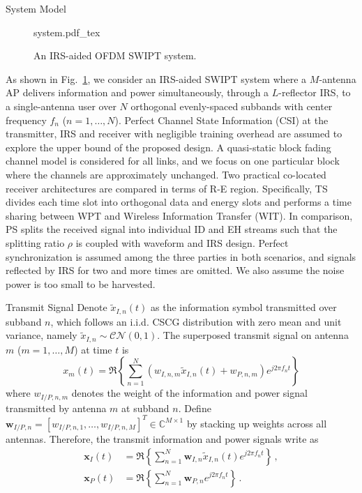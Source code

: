 \documentclass[journal]{IEEEtran}
\begin{document}
	\begin{section}{System Model}\label{se:system_model}
		\begin{figure}[!t]
			\centering
			\def\svgwidth{\columnwidth}
			{system.pdf_tex}
			\caption{An IRS-aided OFDM SWIPT system.}
			\label{fi:system}
		\end{figure}

		As shown in Fig.~\ref{fi:system}, we consider an IRS-aided SWIPT system where a $M$-antenna AP delivers information and power simultaneously, through a $L$-reflector IRS, to a single-antenna user over $N$ orthogonal evenly-spaced subbands with center frequency $f_n$ ($n=1,\dots,N$). Perfect Channel State Information (CSI) at the transmitter, IRS and receiver with negligible training overhead are assumed to explore the upper bound of the proposed design. A quasi-static block fading channel model is considered for all links, and we focus on one particular block where the channels are approximately unchanged. Two practical co-located receiver architectures are compared in terms of R-E region. Specifically, TS divides each time slot into orthogonal data and energy slots and performs a time sharing between WPT and Wireless Information Transfer (WIT). In comparison, PS splits the received signal into individual ID and EH streams such that the splitting ratio $\rho$ is coupled with waveform and IRS design. Perfect synchronization is assumed among the three parties in both scenarios, and signals reflected by IRS for two and more times are omitted. We also assume the noise power is too small to be harvested.


		\begin{subsection}{Transmit Signal}
			Denote $\tilde{x}_{I,n}(t)$ as the information symbol transmitted over subband $n$, which follows an i.i.d. CSCG distribution with zero mean and unit variance, namely $\tilde{x}_{I,n}\sim\mathcal{CN}(0,1)$. The superposed transmit signal on antenna $m$ ($m=1,\dots,M$) at time $t$ is
			\begin{equation}\label{eq:x_m}
				x_m(t)=\Re\left\{\sum_{n=1}^N\left({w_{I,n,m}\tilde{x}_{I,n}(t)}+w_{P,n,m}\right){e^{j2{\pi}{f_n}{t}}}\right\}
			\end{equation}
			where $w_{I/P,n,m}$ denotes the weight of the information and power signal transmitted by antenna $m$ at subband $n$. Define $\boldsymbol{w}_{I/P,n}=[w_{I/P,n,1},\dots,w_{I/P,n,M}]^T \in \mathbb{C}^{M \times 1}$ by stacking up weights across all antennas. Therefore, the transmit information and power signals write as
			\begin{align}
				\boldsymbol{x}_{I}(t) &= \Re{\left\{\sum_{n=1}^N\boldsymbol{w}_{I,n}\tilde{x}_{I,n}(t){e^{j2{\pi}{f_n}{t}}}\right\}}\,,\label{eq:x_I}\\
				\boldsymbol{x}_{P}(t) &= \Re{\left\{\sum_{n=1}^N\boldsymbol{w}_{P,n}{e^{j2{\pi}{f_n}{t}}}\right\}}\,.\label{eq:x_P}
			\end{align}
		\end{subsection}



\end{section}
\end{document}
